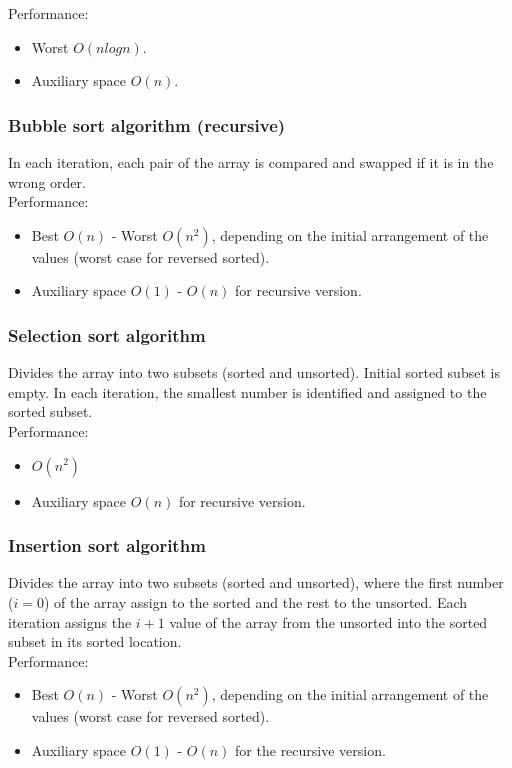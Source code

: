 \documentclass[10pt,bezier]{article}
\begin{document}
Performance:
\begin{itemize}
  \item Worst $O(n log n)$.
  \item Auxiliary space $O(n)$.
\end{itemize}

\subsubsection{Bubble sort algorithm (recursive)} \label{section5.2.4}
In each iteration, each pair of the array is compared and swapped if it is in the wrong order.\\

Performance:
\begin{itemize}
  \item Best $O(n)$ - Worst $O(n^2)$, depending on the initial arrangement of the values (worst case for reversed sorted).
  \item Auxiliary space $O(1)$ - $O(n)$ for recursive version.
\end{itemize}

\subsubsection{Selection sort algorithm} \label{section5.2.5}
Divides the array into two subsets (sorted and unsorted). Initial sorted subset is empty. In each iteration, the smallest number is identified and assigned to the sorted subset.\\

Performance:
\begin{itemize}
  \item $O(n^2)$
  \item Auxiliary space $O(n)$ for recursive version.
\end{itemize}

\subsubsection{Insertion sort algorithm} \label{section5.2.6}
Divides the array into two subsets (sorted and unsorted),  where the first number ($i=0$) of the array assign to the sorted and the rest to the unsorted. Each iteration assigns the $i+1$ value of the array from the unsorted into the sorted subset in its sorted location.\\

Performance:
\begin{itemize}
  \item Best $O(n)$ - Worst $O(n^2)$, depending on the initial arrangement of the values (worst case for reversed sorted).
  \item Auxiliary space $O(1)$ - $O(n)$ for the recursive version.
\end{itemize}
\end{document}
